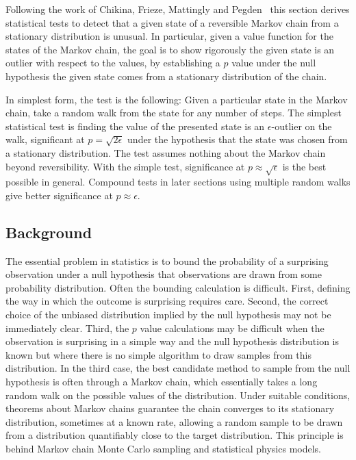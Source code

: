 \documentclass[12pt]{article}
\begin{document}
Following the work of Chikina, Frieze, Mattingly and Pegden~%
\cite{doi:10.1080/2330443X.2020.1806763, Chikina2860, Chikina2019} this
section derives statistical tests to detect that a given state of a
reversible Markov chain from a stationary distribution is unusual.
In particular, given a value function for the states of
the Markov chain, the goal is to show rigorously the given state is an
outlier with respect to the values, by establishing a \( p \) value
under the null hypothesis the given state comes from a stationary
distribution of the chain.

In simplest form, the test is the following:  Given a particular state
in the Markov chain, take a random walk from the state for any number of
steps.  The simplest statistical test is finding the value of the
presented state is an \( \epsilon \)-outlier on the walk, significant at
\( p = \sqrt{2\epsilon} \) under the hypothesis that the state was
chosen from a stationary distribution.  The test assumes nothing about
the Markov chain beyond reversibility.  With the simple test,
significance at \( p \approx \sqrt{\epsilon} \) is the best possible in
general.  Compound tests in later sections using multiple random walks give better
significance at \( p \approx \epsilon \).

\subsection*{Background}

The essential problem in statistics is to bound the probability of a
surprising observation under a null hypothesis that observations are
drawn from some probability distribution.  Often the bounding
calculation is difficult.  First, defining the way in which the outcome
is surprising requires care.  Second, the correct choice of the unbiased
distribution implied by the null hypothesis may not be immediately
clear. Third, the \( p \) value calculations may be difficult when the
observation is surprising in a simple way and the null hypothesis
distribution is known but where there is no simple algorithm to draw
samples from this distribution.  In the third case, the best candidate
method to sample from the null hypothesis is often through a Markov
chain, which essentially takes a long random walk on the possible values
of the distribution.  Under suitable conditions, theorems about Markov
chains guarantee the chain converges to its stationary distribution,
sometimes at a known rate, allowing a random sample to be drawn from a
distribution quantifiably close to the target distribution. This
principle is behind Markov chain Monte Carlo sampling and statistical
physics models.
\end{document}
